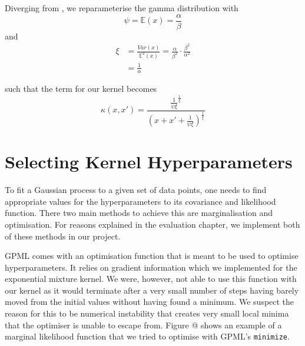 \documentclass[a4paper,12pt,twoside,openright]{report}
\begin{document}
Diverging from \cite{2014arXiv1406.3896S}, we reparameterise the gamma distribution with
\begin{equation}
\psi = \mathbb{E}(x) = \frac{\alpha}{\beta}
\end{equation}
and
\begin{align}
\xi &= \frac{Var(x)}{\mathbb{E}^2 (x)} = \frac{\alpha}{\beta^2} \cdot \frac{\beta^2}{\alpha^2}\\
&= \frac{1}{\alpha}
\end{align}

such that the term for our kernel becomes
\begin{equation}
\kappa(x, x') = \frac{\frac{1}{\psi\xi}^{\frac{1}{\xi}}}{(x+x'+\frac{1}{\psi\xi})^{\frac{1}{\xi}}}
\end{equation}





\section{Selecting Kernel Hyperparameters} 

To fit a Gaussian process to a given set of data points, one needs to find appropriate values for the hyperparameters to its covariance and likelihood function. There two main methods to achieve this are marginalisation and optimisation. For reasons explained in the evaluation chapter, we implement both of these methods in our project.

GPML comes with an optimisation function that is meant to be used to optimise hyperparameters. It relies on gradient information which we implemented for the exponential mixture kernel. We were, however, not able to use this function with our kernel as it would terminate after a very small number of steps having barely moved from the initial values without having found a minimum. We suspect the reason for this to be numerical instability that creates very small local minima that the optimiser is unable to escape from. Figure @ shows an example of a marginal likelihood function that we tried to optimise with GPML's \texttt{minimize}.
\end{document}
